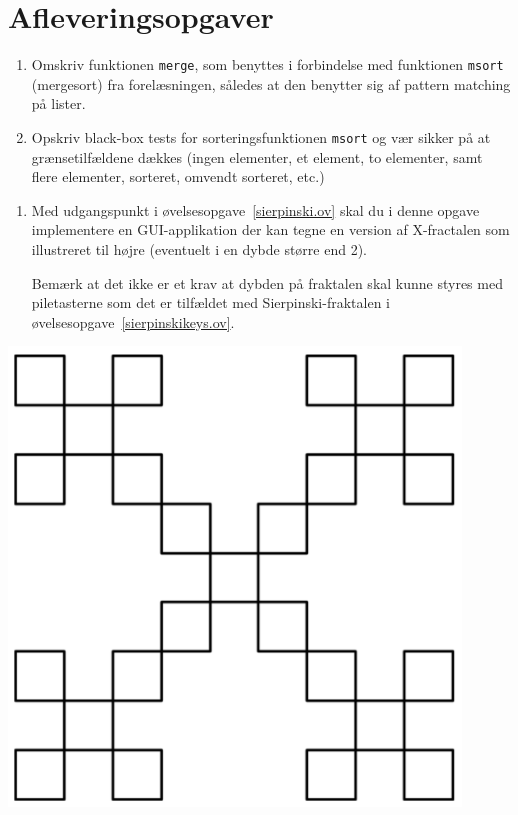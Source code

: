 \documentclass[a4paper,12pt]{article}
\begin{document}
\section*{Afleveringsopgaver}
\begin{enumerate}[label=7i.\arabic*,start=0]
\item Omskriv funktionen \lstinline{merge}, som benyttes i forbindelse
  med funktionen \lstinline{msort} (mergesort) fra forelæsningen,
  således at den benytter sig af pattern matching på lister.
\item Opskriv black-box tests for sorteringsfunktionen \lstinline{msort} og vær
  sikker på at grænsetilfældene dækkes (ingen elementer, et element,
  to elementer, samt flere elementer, sorteret, omvendt sorteret, etc.)
\end{enumerate}

\begin{minipage}{0.7\textwidth}
\begin{enumerate}[label=7i.\arabic*,start=2]
\item Med udgangspunkt i øvelsesopgave~\ref{sierpinski.ov} skal du i
  denne opgave implementere en GUI-applikation der kan tegne en
  version af X-fractalen som illustreret til højre (eventuelt i en
  dybde større end 2).

  Bemærk at det ikke er et krav at dybden på fraktalen skal kunne
  styres med piletasterne som det er tilfældet med
  Sierpinski-fraktalen i øvelsesopgave~\ref{sierpinskikeys.ov}.
\end{enumerate}
\end{minipage}\hspace{8mm} \begin{minipage}{0.25\textwidth}
  \includegraphics[width=0.9\textwidth]{xfractal.png}
\end{minipage}
\end{document}
